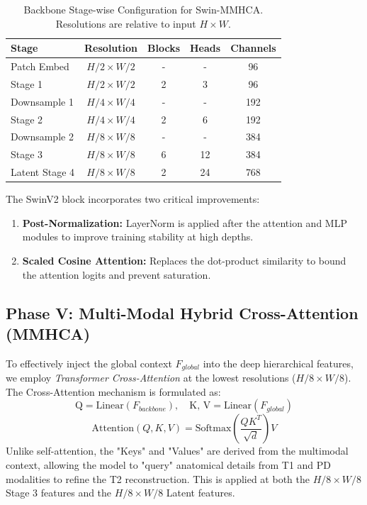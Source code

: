 \documentclass{IEEEoj}
\begin{document}
\begin{table}[H]
\centering
\caption{Backbone Stage-wise Configuration for Swin-MMHCA. Resolutions are relative to input $H \times W$.}
\label{tab:backbone_specs}
\begin{tabular}{lcccc}
\toprule
\textbf{Stage} & \textbf{Resolution} & \textbf{Blocks} & \textbf{Heads} & \textbf{Channels} \\
\midrule
Patch Embed & $H/2 \times W/2$ & - & - & 96 \\
Stage 1 & $H/2 \times W/2$ & 2 & 3 & 96 \\
Downsample 1 & $H/4 \times W/4$ & - & - & 192 \\
Stage 2 & $H/4 \times W/4$ & 2 & 6 & 192 \\
Downsample 2 & $H/8 \times W/8$ & - & - & 384 \\
Stage 3 & $H/8 \times W/8$ & 6 & 12 & 384 \\
Latent Stage 4 & $H/8 \times W/8$ & 2 & 24 & 768 \\
\bottomrule
\end{tabular}
\end{table}

The SwinV2 block incorporates two critical improvements:
\begin{enumerate}
    \item \textbf{Post-Normalization:} LayerNorm is applied after the attention and MLP modules to improve training stability at high depths.
    \item \textbf{Scaled Cosine Attention:} Replaces the dot-product similarity to bound the attention logits and prevent saturation.
\end{enumerate}

\subsection{Phase V: Multi-Modal Hybrid Cross-Attention (MMHCA)}
To effectively inject the global context $F_{global}$ into the deep hierarchical features, we employ \textit{Transformer Cross-Attention} at the lowest resolutions ($H/8 \times W/8$).
The Cross-Attention mechanism is formulated as:
\begin{equation}
    \text{Q} = \text{Linear}(F_{backbone}), \quad \text{K, V} = \text{Linear}(F_{global})
\end{equation}
\begin{equation}
    \text{Attention}(Q, K, V) = \text{Softmax}\left(\frac{QK^T}{\sqrt{d}}\right)V
\end{equation}
Unlike self-attention, the "Keys" and "Values" are derived from the multimodal context, allowing the model to "query" anatomical details from T1 and PD modalities to refine the T2 reconstruction. This is applied at both the $H/8 \times W/8$ Stage 3 features and the $H/8 \times W/8$ Latent features.
\end{document}
